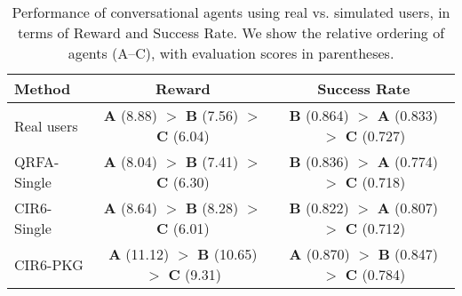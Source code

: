 \begin{table*}[t]
	\caption{Performance of conversational agents using real vs. simulated users, in terms of Reward and Success Rate.  We show the relative ordering of agents (A--C), with evaluation scores in parentheses.}
	\captionshrink
	\begin{tabular}{l|c|c}
	\toprule
	\textbf{Method} & \textbf{Reward} & \textbf{Success Rate} \\
	\midrule
	Real users &
		\textbf{A} (8.88) $>$ \textbf{B} (7.56) $>$ \textbf{C} (6.04) &
		\textbf{B} (0.864) $>$ \textbf{A} (0.833) $>$ \textbf{C} (0.727) \\
	QRFA-Single &
		\textbf{A} (8.04) $>$ \textbf{B} (7.41) $>$ \textbf{C} (6.30) &
		\textbf{B} (0.836) $>$ \textbf{A} (0.774) $>$ \textbf{C} (0.718) \\
	CIR6-Single &
		\textbf{A} (8.64) $>$ \textbf{B} (8.28) $>$ \textbf{C} (6.01) &
		\textbf{B} (0.822) $>$ \textbf{A} (0.807) $>$ \textbf{C} (0.712) \\
	CIR6-PKG &
		\textbf{A} (11.12) $>$ \textbf{B} (10.65) $>$ \textbf{C} (9.31) &
		\textbf{A} (0.870) $>$ \textbf{B} (0.847) $>$ \textbf{C} (0.784) \\
	\bottomrule
	\end{tabular}
	\shrink
\label{tbl:auto}
\end{table*}